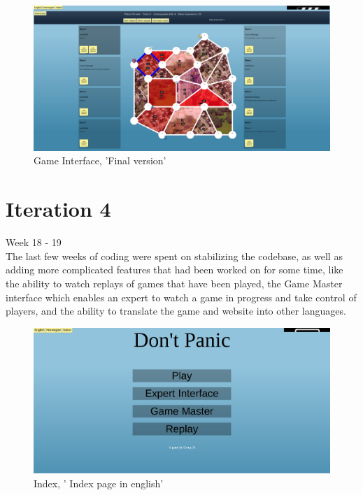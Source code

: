 \begin{figure}[H]
  \centering
    \includegraphics[width=1.0\textwidth]{img/gamefinal.png}
  \caption{Game Interface, 'Final version'} 
  \label{fig:gamefinal}
\end{figure}


\section{Iteration 4}

Week 18 - 19\\
\newline
The last few weeks of coding were spent on stabilizing the codebase, as well as adding more complicated features that had been worked on for some time, like the ability to watch replays of games that have been played, the Game Master interface which enables an expert to watch a game in progress and take control of players, and the ability to translate the game and website into other languages.\\



\begin{figure}[H]
  \centering
    \includegraphics[width=1.0\textwidth]{img/indexen.png}
  \caption{Index, ' Index page in english'} 
  \label{fig:indexen}
\end{figure}


